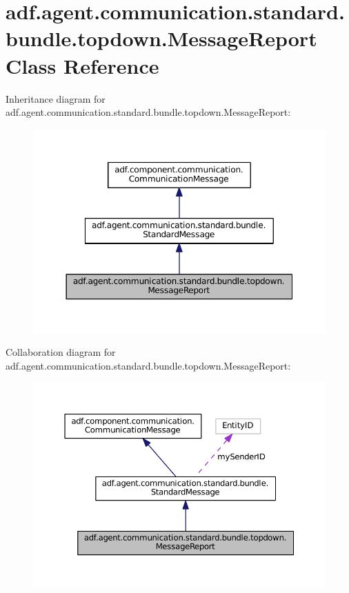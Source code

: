 \hypertarget{classadf_1_1agent_1_1communication_1_1standard_1_1bundle_1_1topdown_1_1MessageReport}{}\section{adf.\+agent.\+communication.\+standard.\+bundle.\+topdown.\+Message\+Report Class Reference}
\label{classadf_1_1agent_1_1communication_1_1standard_1_1bundle_1_1topdown_1_1MessageReport}


Inheritance diagram for adf.\+agent.\+communication.\+standard.\+bundle.\+topdown.\+Message\+Report\+:
\nopagebreak
\begin{figure}[H]
\begin{center}
\leavevmode
\includegraphics[width=350pt]{classadf_1_1agent_1_1communication_1_1standard_1_1bundle_1_1topdown_1_1MessageReport__inherit__graph}
\end{center}
\end{figure}


Collaboration diagram for adf.\+agent.\+communication.\+standard.\+bundle.\+topdown.\+Message\+Report\+:
\nopagebreak
\begin{figure}[H]
\begin{center}
\leavevmode
\includegraphics[width=350pt]{classadf_1_1agent_1_1communication_1_1standard_1_1bundle_1_1topdown_1_1MessageReport__coll__graph}
\end{center}
\end{figure}
